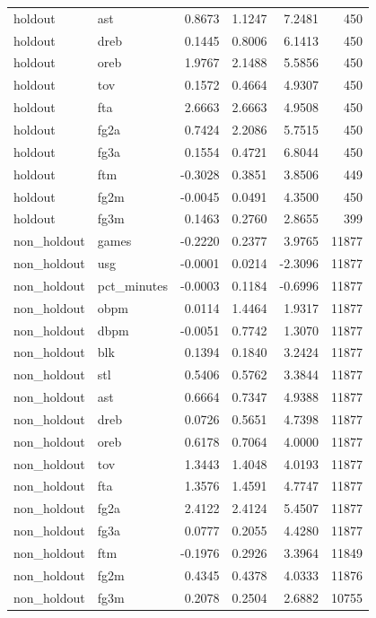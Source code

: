 \begin{table}
\begin{tabular}{llrrrr}
holdout & ast & 0.8673 & 1.1247 & 7.2481 & 450 \\
holdout & dreb & 0.1445 & 0.8006 & 6.1413 & 450 \\
holdout & oreb & 1.9767 & 2.1488 & 5.5856 & 450 \\
holdout & tov & 0.1572 & 0.4664 & 4.9307 & 450 \\
holdout & fta & 2.6663 & 2.6663 & 4.9508 & 450 \\
holdout & fg2a & 0.7424 & 2.2086 & 5.7515 & 450 \\
holdout & fg3a & 0.1554 & 0.4721 & 6.8044 & 450 \\
holdout & ftm & -0.3028 & 0.3851 & 3.8506 & 449 \\
holdout & fg2m & -0.0045 & 0.0491 & 4.3500 & 450 \\
holdout & fg3m & 0.1463 & 0.2760 & 2.8655 & 399 \\
non\_holdout & games & -0.2220 & 0.2377 & 3.9765 & 11877 \\
non\_holdout & usg & -0.0001 & 0.0214 & -2.3096 & 11877 \\
non\_holdout & pct\_minutes & -0.0003 & 0.1184 & -0.6996 & 11877 \\
non\_holdout & obpm & 0.0114 & 1.4464 & 1.9317 & 11877 \\
non\_holdout & dbpm & -0.0051 & 0.7742 & 1.3070 & 11877 \\
non\_holdout & blk & 0.1394 & 0.1840 & 3.2424 & 11877 \\
non\_holdout & stl & 0.5406 & 0.5762 & 3.3844 & 11877 \\
non\_holdout & ast & 0.6664 & 0.7347 & 4.9388 & 11877 \\
non\_holdout & dreb & 0.0726 & 0.5651 & 4.7398 & 11877 \\
non\_holdout & oreb & 0.6178 & 0.7064 & 4.0000 & 11877 \\
non\_holdout & tov & 1.3443 & 1.4048 & 4.0193 & 11877 \\
non\_holdout & fta & 1.3576 & 1.4591 & 4.7747 & 11877 \\
non\_holdout & fg2a & 2.4122 & 2.4124 & 5.4507 & 11877 \\
non\_holdout & fg3a & 0.0777 & 0.2055 & 4.4280 & 11877 \\
non\_holdout & ftm & -0.1976 & 0.2926 & 3.3964 & 11849 \\
non\_holdout & fg2m & 0.4345 & 0.4378 & 4.0333 & 11876 \\
non\_holdout & fg3m & 0.2078 & 0.2504 & 2.6882 & 10755 \\
\bottomrule
\end{tabular}
\end{table}
